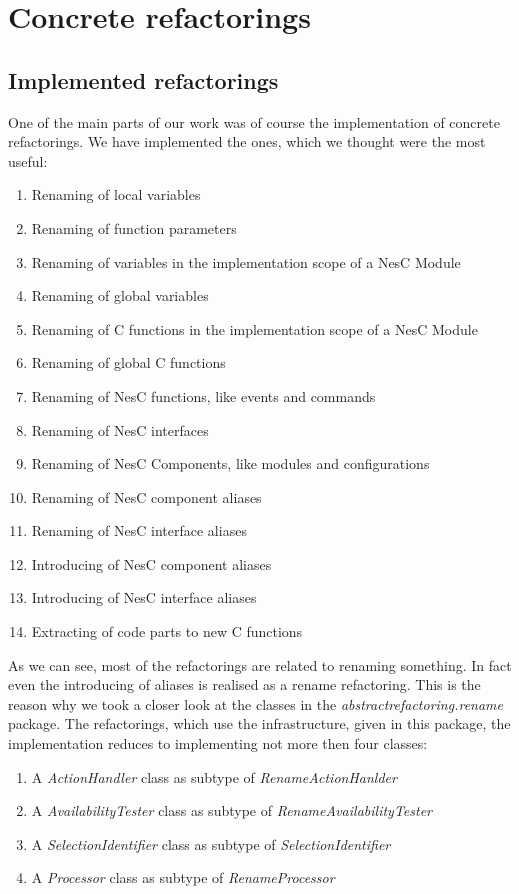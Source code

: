 \documentclass[a4paper,10pt]{report}
\begin{document}
\chapter{Concrete refactorings}
\section{Implemented refactorings}
One of the main parts of our work was of course the implementation of concrete refactorings. We have implemented the ones, which we thought were the most useful:
   \begin{enumerate}
     \item Renaming of local variables
     \item Renaming of function parameters
     \item Renaming of variables in the implementation scope of a NesC Module
     \item Renaming of global variables
     \item Renaming of C functions in the implementation scope of a NesC Module 
     \item Renaming of global C functions
     \item Renaming of NesC functions, like events and commands
     \item Renaming of NesC interfaces
     \item Renaming of NesC Components, like modules and configurations
     \item Renaming of NesC component aliases
     \item Renaming of NesC interface aliases
     \item Introducing of NesC component aliases
     \item Introducing of NesC interface aliases
     \item Extracting of code parts to new C functions
   \end{enumerate}
As we can see, most of the refactorings are related to renaming something. In fact even the introducing of aliases is realised as a rename refactoring. This is the reason why we took a closer look at the classes in the {\it abstractrefactoring.rename} package. 
The refactorings, which use the infrastructure, given in this package, the implementation reduces to implementing not more then four classes:
   \begin{enumerate}
     \item A {\it ActionHandler} class as subtype of {\it RenameActionHanlder}
     \item A {\it AvailabilityTester} class as subtype of {\it RenameAvailabilityTester}
     \item A {\it SelectionIdentifier} class as subtype of {\it SelectionIdentifier}
     \item A {\it Processor} class as subtype of {\it RenameProcessor}
   \end{enumerate}
\end{document}
